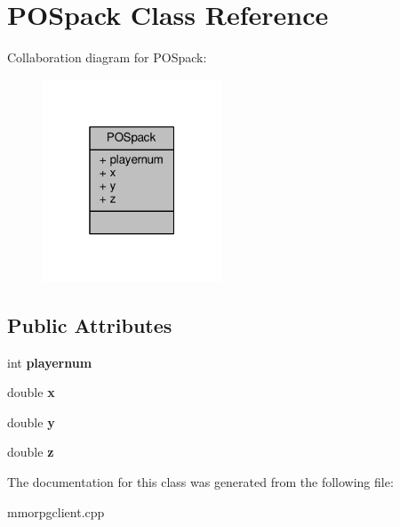\hypertarget{classPOSpack}{}\section{P\+O\+Spack Class Reference}
\label{classPOSpack}


Collaboration diagram for P\+O\+Spack\+:
\nopagebreak
\begin{figure}[H]
\begin{center}
\leavevmode
\includegraphics[width=151pt]{d4/d20/classPOSpack__coll__graph}
\end{center}
\end{figure}
\subsection*{Public Attributes}
\begin{DoxyCompactItemize}
\item 
int {\bfseries playernum}\hypertarget{classPOSpack_ae78f4c675066261462a33692e2482ace}{}\label{classPOSpack_ae78f4c675066261462a33692e2482ace}

\item 
double {\bfseries x}\hypertarget{classPOSpack_a1d35b31d2bd3027b0c544735f537882c}{}\label{classPOSpack_a1d35b31d2bd3027b0c544735f537882c}

\item 
double {\bfseries y}\hypertarget{classPOSpack_a4641a3f531cc61334497686cd9d731dc}{}\label{classPOSpack_a4641a3f531cc61334497686cd9d731dc}

\item 
double {\bfseries z}\hypertarget{classPOSpack_a8779281b24b49a7f9868c1eabc8c07d7}{}\label{classPOSpack_a8779281b24b49a7f9868c1eabc8c07d7}

\end{DoxyCompactItemize}


The documentation for this class was generated from the following file\+:\begin{DoxyCompactItemize}
\item 
mmorpgclient.\+cpp\end{DoxyCompactItemize}
